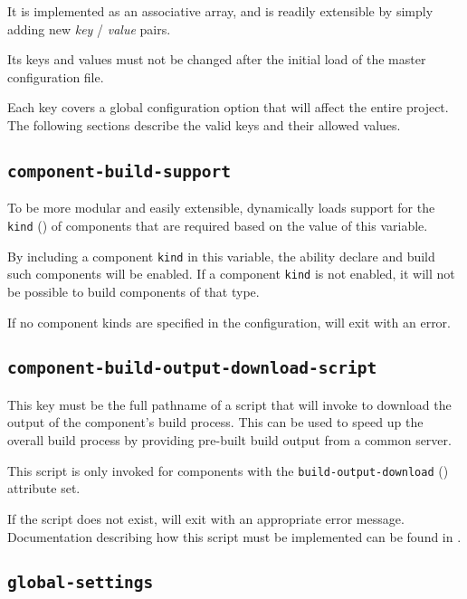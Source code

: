 It is implemented as an associative array, and is readily extensible
by simply adding new \emph{key} / \emph{value} pairs.

Its keys and values must not be changed after the initial load of the
master configuration file.

Each key covers a global configuration option that will affect the
entire project.  The following sections describe the valid keys and
their allowed values.


\subsection{\texttt{component-build-support}}\label{variables:component-build-support}

To be more modular and easily extensible, \lmsbw dynamically loads
support for the \texttt{kind} () of components
that are required based on the value of this variable.

By including a component \texttt{kind} in this variable, the ability
declare and build such components will be enabled.  If a component
\texttt{kind} is not enabled, it will not be possible to build
components of that type.

If no component kinds are specified in the configuration, \lmsbw will
exit with an error.

\subsection{\texttt{component-build-output-download-script}}
\label{variables:component-build-output-download-script}

This key must be the full pathname of a script that \lmsbw will invoke
to download the \destdir output of the component's build process.
This can be used to speed up the overall build process by providing
pre-built build output from a common server.

This script is only invoked for components with the
\texttt{build-output-download}
() attribute set.

If the script does not exist, \lmsbw will exit with an appropriate
error message.  Documentation describing how this script must be
implemented can be found in .

\subsection{\texttt{global-settings}}\label{variables:global-settings}

